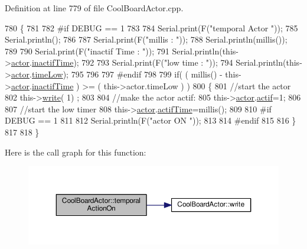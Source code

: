 Definition at line 779 of file Cool\+Board\+Actor.\+cpp.


\begin{DoxyCode}
780 \{
781 
782 \textcolor{preprocessor}{#if DEBUG == 1}
783     
784     Serial.print(F(\textcolor{stringliteral}{"temporal Actor "}));
785     Serial.println();
786 
787     Serial.print(F(\textcolor{stringliteral}{"millis : "}));
788     Serial.println(millis());
789 
790     Serial.print(F(\textcolor{stringliteral}{"inactif Time : "}));
791     Serial.println(this->\hyperlink{class_cool_board_actor_a8f190db9f7a39fddbcef7f152da970e9}{actor}.\hyperlink{struct_cool_board_actor_1_1state_a6d88835f4402b3b81cd404784281854b}{inactifTime});
792 
793     Serial.print(F(\textcolor{stringliteral}{"low time : "}));
794     Serial.println(this->\hyperlink{class_cool_board_actor_a8f190db9f7a39fddbcef7f152da970e9}{actor}.\hyperlink{struct_cool_board_actor_1_1state_a314c53c146e8c7b12c025323a34fbb9a}{timeLow});
795 
796 
797 \textcolor{preprocessor}{#endif}
798     
799      \textcolor{keywordflow}{if}( ( millis() - this->\hyperlink{class_cool_board_actor_a8f190db9f7a39fddbcef7f152da970e9}{actor}.\hyperlink{struct_cool_board_actor_1_1state_a6d88835f4402b3b81cd404784281854b}{inactifTime} ) >= (  this->actor.timeLow  ) )
800     \{
801         \textcolor{comment}{//start the actor}
802         this->\hyperlink{class_cool_board_actor_a958786ff01ea1056ee72c72d439f86da}{write}( 1) ;
803 
804         \textcolor{comment}{//make the actor actif:}
805         this->\hyperlink{class_cool_board_actor_a8f190db9f7a39fddbcef7f152da970e9}{actor}.\hyperlink{struct_cool_board_actor_1_1state_a7963178c2de01ef0d2861f9f59ad6f3c}{actif}=1;
806 
807         \textcolor{comment}{//start the low timer}
808         this->\hyperlink{class_cool_board_actor_a8f190db9f7a39fddbcef7f152da970e9}{actor}.\hyperlink{struct_cool_board_actor_1_1state_a534119a22a09b29ecb446b277d5b2ef5}{actifTime}=millis();
809 
810 \textcolor{preprocessor}{    #if DEBUG == 1 }
811 
812         Serial.println(F(\textcolor{stringliteral}{"actor ON "}));
813 
814 \textcolor{preprocessor}{    #endif              }
815 
816     \}
817 
818 \}
\end{DoxyCode}
Here is the call graph for this function\+:
\nopagebreak
\begin{figure}[H]
\begin{center}
\leavevmode
\includegraphics[width=350pt]{dc/d69/class_cool_board_actor_ada603785c203fdb0b41cc967d70bdc4d_cgraph}
\end{center}
\end{figure}
